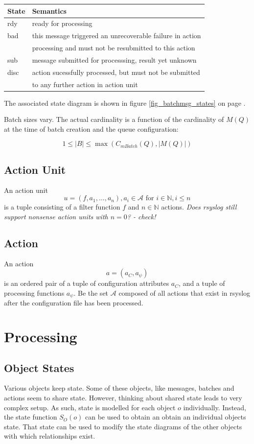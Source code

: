 \documentclass[a4paper,10pt]{article}
\newcommand{\IN}{\mathbb{N}}
\newcommand{\AAA}{\mathcal{A}}
\begin{document}
\begin{center}
\begin{tabular}{|l|l|} \hline
	State		& Semantics \\\hline
	rdy 		& ready for processing\\
	bad		& this message triggered an unrecoverable failure in action\\
			& processing and must not be resubmitted to this action\\
	sub		& message submitted for processsing, result yet unknown \\
	disc		& action sucessfully processed, but must not be submitted \\
			& to any further action in action unit \\\hline
\end{tabular}
\end{center}
The associated state diagram is shown in figure \ref{fig_batchmsg_states} on page \pageref{fig_batchmsg_states}.

Batch sizes vary. The actual cardinality is a function of the cardinality of $M(Q)$ at the time of batch creation and the queue configuration:

$$1 \leq |B| \leq \max(C_{mBatch}(Q), |M(Q)|)$$

\subsection{Action Unit}
An action unit 
$$u = (f, a_1, \ldots, a_n), a_i \in \AAA \text{ for } i \in \IN, i \le n$$
is a tuple consisting of a filter function $f$ and $n \in \IN$ actions. \emph{Does rsyslog still support nonsense action units with $n=0$? - check!}

\subsection{Action}
An action
$$a = (a_C, a_\psi)$$
is an ordered pair of a tuple of configuration attributes $a_C$, and a tuple of processing functions $a_\psi$. Be the set $\AAA$ composed of all actions that exist in rsyslog after the configuration file has been processed.


\section{Processing}
\subsection{Object States}
Various objects keep state. Some of these objects, like messages, batches and actions seem to share state. However, thinking about shared state leads to very complex setup. As such, state is modelled for each object $o$ individually. Instead, the state function $S_O(o)$ can be used to obtain an obtain an individual objects state. That state can be used to modify the state diagrams of the other objects with which relationships exist.
\end{document}
